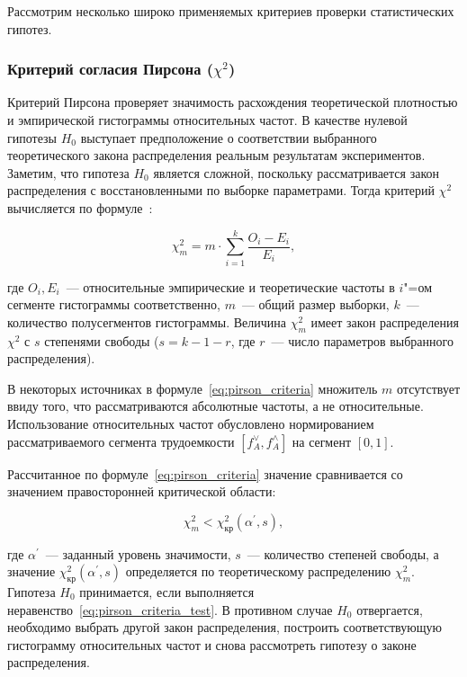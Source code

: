 \documentclass[a4paper, article, 14pt]{extarticle}
\begin{document}
Рассмотрим несколько широко применяемых критериев проверки статистических гипотез.

\subsubsection{Критерий согласия Пирсона ($\chi^2$)}\label{sec:pirson_criteria}

Критерий Пирсона проверяет значимость расхождения теоретической плотностью и эмпирической гистограммы относительных частот. В качестве нулевой гипотезы $H_0$ выступает предположение о соответствии выбранного теоретического закона распределения реальным результатам экспериментов. Заметим, что гипотеза $H_0$ является сложной, поскольку рассматривается закон распределения с восстановленными по выборке параметрами. Тогда критерий $\chi^2$ вычисляется по формуле~\cite{koroluk}:

\begin{equation}\label{eq:pirson_criteria}
	\chi_m^2 = m \cdot \sum_{i=1}^{k}{\frac{O_i - E_i}{E_i}},
\end{equation}

\noindent где $O_i, E_i$~--- относительные эмпирические и теоретические частоты в $i$"=ом сегменте гистограммы соответственно, $m$~--- общий размер выборки, $k$~--- количество полусегментов гистограммы. Величина $\chi_m^2$ имеет закон распределения $\chi^2$ с $s$ степенями свободы ($s = k - 1 - r$, где $r$~--- число параметров выбранного распределения).

В некоторых источниках в формуле~\eqref{eq:pirson_criteria} множитель $m$ отсутствует ввиду того, что рассматриваются абсолютные частоты, а не относительные. Использование относительных частот обусловлено нормированием рассматриваемого сегмента трудоемкости $[f_A^\vee, f_A^\wedge]$ на сегмент $[0, 1]$.

Рассчитанное по формуле~\eqref{eq:pirson_criteria} значение сравнивается со значением правосторонней критической области:

\begin{equation}\label{eq:pirson_criteria_test}
	\chi_m^2 < \chi_\text{кр}^2(\alpha^{'}, s),
\end{equation}

\noindent где $\alpha^{'}$~--- заданный уровень значимости, $s$~--- количество степеней свободы, а значение $\chi_\text{кр}^2(\alpha^{'}, s)$ определяется по теоретическому распределению $\chi_m^2$. Гипотеза $H_0$ принимается, если выполняется неравенство~\eqref{eq:pirson_criteria_test}. В противном случае $H_0$ отвергается, необходимо выбрать другой закон распределения, построить соответствующую гистограмму относительных частот и снова рассмотреть гипотезу о законе распределения.
\end{document}
